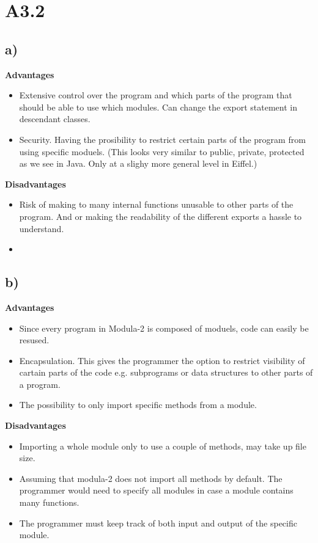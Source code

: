 \section{A3.2}
\subsection{a)}

\textbf{Advantages}
\begin{itemize}
    \item Extensive control over the program and which parts of the program
    that should be able to use which modules. Can change the export statement in descendant classes.
    \item Security. Having the prosibility to restrict certain parts of the program
    from using specific moduels. (This looks very similar to public, private, protected as we see in Java. Only
    at a slighy more general level in Eiffel.)
\end{itemize}

\noindent\textbf{Disadvantages}
\begin{itemize}
    \item Risk of making to many internal functions unusable to other parts of the
    program. And or making the readability of the different exports a hassle to understand.
    \item 
\end{itemize}

\subsection{b)}

\textbf{Advantages}
\begin{itemize}
    \item Since every program in Modula-2 is composed of moduels, code can easily be resused.
    \item Encapsulation. This gives the programmer the option to restrict visibility of cartain
    parts of the code e.g. subprograms or data structures to other parts of a program.
    \item The possibility to only import specific methods from a module.
\end{itemize}

\noindent\textbf{Disadvantages}
\begin{itemize}
    \item Importing a whole module only to use a couple of methods, may take up file size.
    \item Assuming that modula-2 does not import all methods by default. The programmer
    would need to specify all modules in case a module contains many functions.
    \item The programmer must keep track of both input and output of the specific module.
\end{itemize}